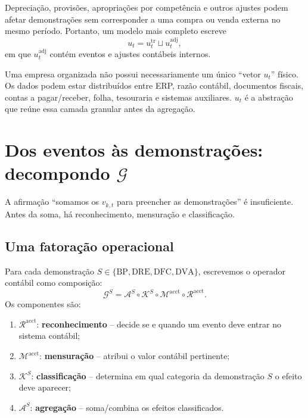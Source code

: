\documentclass[11pt,a4paper]{article}
\newcommand{\BP}{\mathrm{BP}}
\newcommand{\DRE}{\mathrm{DRE}}
\newcommand{\DFC}{\mathrm{DFC}}
\newcommand{\DVA}{\mathrm{DVA}}
\newcommand{\cG}{\mathcal{G}}
\newcommand{\cA}{\mathcal{A}}
\newcommand{\cM}{\mathcal{M}}
\newcommand{\cK}{\mathcal{K}}
\newcommand{\cR}{\mathcal{R}}
\begin{document}
Depreciação, provisões, apropriações por competência e outros ajustes podem afetar demonstrações sem corresponder a uma compra ou venda externa no mesmo período. Portanto, um modelo mais completo escreve
\begin{equation}
\boxed{u_t=u_t^{\mathrm{tr}}\sqcup u_t^{\mathrm{adj}},}
\label{eq:u-extendido}
\end{equation}
em que $u_t^{\mathrm{adj}}$ contém eventos e ajustes contábeis internos.

\begin{intuicao}
Uma empresa organizada não possui necessariamente um único ``vetor $u_t$'' físico. Os dados podem estar distribuídos entre ERP, razão contábil, documentos fiscais, contas a pagar/receber, folha, tesouraria e sistemas auxiliares. $u_t$ é a abstração que reúne essa camada granular antes da agregação.
\end{intuicao}

\section[Dos eventos às demonstrações: decompondo G]{Dos eventos às demonstrações: decompondo $\mathcal G$}

A afirmação ``somamos os $v_{k,t}$ para preencher as demonstrações'' é insuficiente. Antes da soma, há reconhecimento, mensuração e classificação.

\subsection{Uma fatoração operacional}

Para cada demonstração $S\in\{\BP,\DRE,\DFC,\DVA\}$, escrevemos o operador contábil como composição:
\begin{equation}
\boxed{
\cG^{S}
=
\cA^{S}\circ\cK^{S}\circ\cM^{\mathrm{acct}}\circ\cR^{\mathrm{acct}}.
}
\label{eq:G-factor}
\end{equation}
Os componentes são:

\begin{enumerate}
    \item $\cR^{\mathrm{acct}}$: \textbf{reconhecimento} -- decide se e quando um evento deve entrar no sistema contábil;
    \item $\cM^{\mathrm{acct}}$: \textbf{mensuração} -- atribui o valor contábil pertinente;
    \item $\cK^{S}$: \textbf{classificação} -- determina em qual categoria da demonstração $S$ o efeito deve aparecer;
    \item $\cA^{S}$: \textbf{agregação} -- soma/combina os efeitos classificados.
\end{enumerate}
\end{document}
